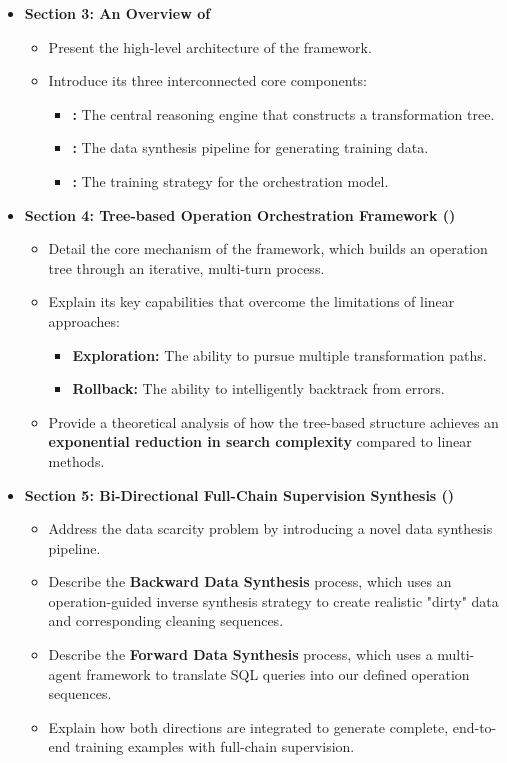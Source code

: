 \begin{itemize}
    \item \textbf{Section 3: An Overview of \sys}
    \begin{itemize}
        \item Present the high-level architecture of the \sys framework.
        \item Introduce its three interconnected core components:
        \begin{itemize}
            \item \textbf{\promptframework:} The central reasoning engine that constructs a transformation tree.
            \item \textbf{\datasyn:} The data synthesis pipeline for generating training data.
            \item \textbf{\policylearn:} The training strategy for the orchestration model.
        \end{itemize}
    \end{itemize}

    \item \textbf{Section 4: Tree-based Operation Orchestration Framework (\promptframework)}
    \begin{itemize}
        \item Detail the core mechanism of the framework, which builds an operation tree through an iterative, multi-turn process.
        \item Explain its key capabilities that overcome the limitations of linear approaches:
        \begin{itemize}
            \item \textbf{Exploration:} The ability to pursue multiple transformation paths.
            \item \textbf{Rollback:} The ability to intelligently backtrack from errors.
        \end{itemize}
        \item Provide a theoretical analysis of how the tree-based structure achieves an \textbf{exponential reduction in search complexity} compared to linear methods.
    \end{itemize}

    \item \textbf{Section 5: Bi-Directional Full-Chain Supervision Synthesis (\datasyn)}
    \begin{itemize}
        \item Address the data scarcity problem by introducing a novel data synthesis pipeline.
        \item Describe the \textbf{Backward Data Synthesis} process, which uses an operation-guided inverse synthesis strategy to create realistic "dirty" data and corresponding cleaning sequences.
        \item Describe the \textbf{Forward Data Synthesis} process, which uses a multi-agent framework to translate SQL queries into our defined operation sequences.
        \item Explain how both directions are integrated to generate complete, end-to-end training examples with full-chain supervision.
    \end{itemize}


\end{itemize}
